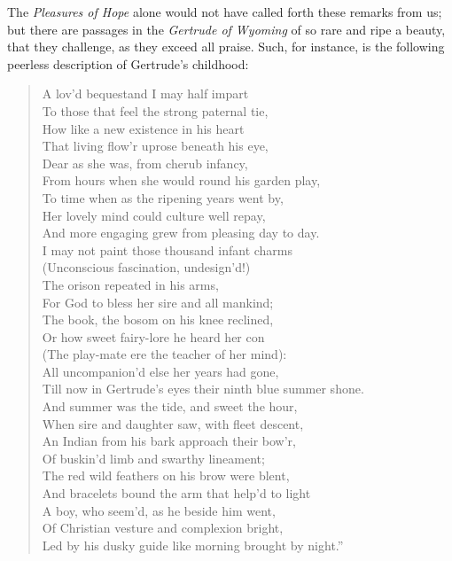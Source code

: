 The \emph{Pleasures of Hope} alone would not have called forth these remarks
from us; but there are passages in the \emph{Gertrude of Wyoming} of so rare
and ripe a beauty, that they challenge, as they exceed all praise.
Such, for instance, is the following peerless description of Gertrude's
childhood:\textemdash 
\begin{verse} %
  A lov'd bequest\textemdash and I may half impart\textemdash\\
  To those that feel the strong paternal tie,\\
  How like a new existence in his heart\\
  That living flow'r uprose beneath his eye,\\
  Dear as she was, from cherub infancy,\\
  From hours when she would round his garden play,\\
  To time when as the ripening years went by,\\
  Her lovely mind could culture well repay,\\
  And more engaging grew from pleasing day to day.\\[\stanzaskip]

  I may not paint those thousand infant charms\\
  (Unconscious fascination, undesign'd!)\\
  The orison repeated in his arms,\\
  For God to bless her sire and all mankind;\\
  The book, the bosom on his knee reclined,\\
  Or how sweet fairy-lore he heard her con\\
  (The play-mate ere the teacher of her mind):\\
  All uncompanion'd else her years had gone,\\
  Till now in Gertrude's eyes their ninth blue summer shone.\\[\stanzaskip]

  And summer was the tide, and sweet the hour,\\
  When sire and daughter saw, with fleet descent,\\
  An Indian from his bark approach their bow'r,\\
  Of buskin'd limb and swarthy lineament;\\
  The red wild feathers on his brow were blent,\\
  And bracelets bound the arm that help'd to light\\
  A boy, who seem'd, as he beside him went,\\
  Of Christian vesture and complexion bright,\\
  Led by his dusky guide like morning brought by night.''\\
\end{verse}
